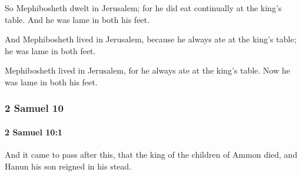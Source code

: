 			\begin{versebox}
					\item[BHS] 
					\item[ASV] So Mephibosheth dwelt in Jerusalem; for he did eat continually at the king's table. And he was lame in both his feet.
					\item[NIV] And Mephibosheth lived in Jerusalem, because he always ate at the king’s table; he was lame in both feet.
					\item[NRSV] Mephibosheth lived in Jerusalem, for he always ate at the king’s table. Now he was lame in both his feet.
			\end{versebox}
	\subsubsection{2 Samuel 10} %
		\label{2SAMUEL-10}

		\paragraph{2 Samuel 10:1} %
			\label{2SAMUEL-10-1}

			And it came to pass after this, that the king of the children of Ammon died, and Hanun his son reigned in his stead.

